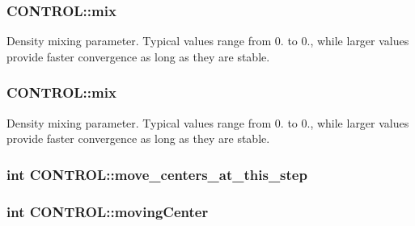 \hypertarget{struct_c_o_n_t_r_o_l_a396a51d569f9f5a97dd5c3614de23144}{
\subsubsection[{mix}]{ C\-O\-N\-T\-R\-O\-L\-::mix}}\label{struct_c_o_n_t_r_o_l_a396a51d569f9f5a97dd5c3614de23144}
Density mixing parameter. Typical values range from 0. to 0., while larger values provide faster convergence as long as they are stable. \hypertarget{struct_c_o_n_t_r_o_l_a0c92233b04318ee8201e98784f481425}{
\subsubsection[{mix}]{ C\-O\-N\-T\-R\-O\-L\-::mix}}\label{struct_c_o_n_t_r_o_l_a0c92233b04318ee8201e98784f481425}
Density mixing parameter. Typical values range from 0. to 0., while larger values provide faster convergence as long as they are stable. \hypertarget{struct_c_o_n_t_r_o_l_a5af53acdcaf08dcf7cbbf99d0f05cb96}{
\subsubsection[{move\-\_\-centers\-\_\-at\-\_\-this\-\_\-step}]{\setlength{\rightskip}{0pt plus 5cm}int C\-O\-N\-T\-R\-O\-L\-::move\-\_\-centers\-\_\-at\-\_\-this\-\_\-step}}\label{struct_c_o_n_t_r_o_l_a5af53acdcaf08dcf7cbbf99d0f05cb96}
\hypertarget{struct_c_o_n_t_r_o_l_a3d603f4cf688980a7a4eb7e634a2c44c}{
\subsubsection[{moving\-Center}]{\setlength{\rightskip}{0pt plus 5cm}int C\-O\-N\-T\-R\-O\-L\-::moving\-Center}}\label{struct_c_o_n_t_r_o_l_a3d603f4cf688980a7a4eb7e634a2c44c}
